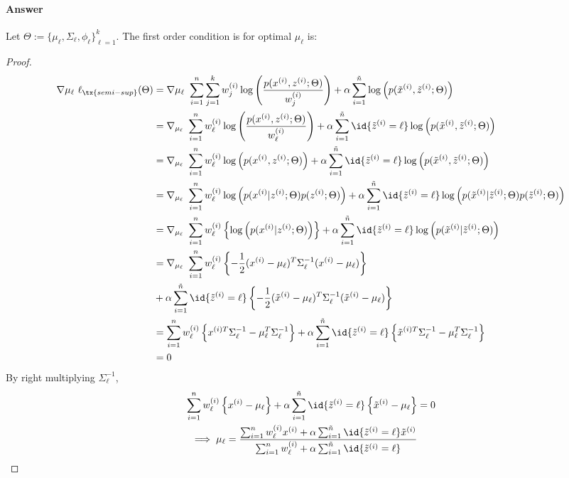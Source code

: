 \documentclass[11pt]{article}
\newcommand{\upi}[0]{^{(i)}}
\begin{document}
	\paragraph{Answer} Let $\Theta := \{\mu_\ell, \Sigma_\ell, \phi_\ell\}_{\ell=1}^k$. The first order condition is for optimal $\mu_\ell$ is:
	\begin{proof}
		\begin{align}
			\nabla{\mu_\ell}\ \ell_{\tx{semi-sup}}(\Theta) &= \nabla{\mu_\ell}\ \sum_{i=1}^n \sum_{j=1}^k w\upi_j \log \left( \frac{p(x\upi, z\upi; \Theta)}{w\upi_j} \right) + \alpha \sum_{i=1}^{\tilde{n}} \log \left(p(\tilde{x}\upi, \tilde{z}\upi; \Theta)
			\right) \\
			&= \nabla_{\mu_\ell}\ \sum_{i=1}^n w\upi_\ell \log \left( \frac{p(x\upi, z\upi; \Theta)}{w\upi_\ell} \right) + \alpha \sum_{i=1}^{\tilde{n}} \id{\tilde{z}\upi = \ell} \log \left(p(\tilde{x}\upi, \tilde{z}\upi; \Theta) \right) \\
			&= \nabla_{\mu_\ell}\ \sum_{i=1}^n w\upi_\ell \log \left(p(x\upi, z\upi; \Theta) \right) + \alpha \sum_{i=1}^{\tilde{n}} \id{\tilde{z}\upi = \ell} \log \left(p(\tilde{x}\upi, \tilde{z}\upi; \Theta) \right) \\
			&= \nabla_{\mu_\ell}\ \sum_{i=1}^n w\upi_\ell \log \left(p(x\upi | z\upi; \Theta) p(z\upi; \Theta) \right) + \alpha \sum_{i=1}^{\tilde{n}} \id{\tilde{z}\upi = \ell} \log \left(p(\tilde{x}\upi | \tilde{z}\upi; \Theta) p(\tilde{z}\upi; \Theta) \right) \\
			&= \nabla_{\mu_\ell}\ \sum_{i=1}^n w\upi_\ell \left \{
			\log \left(
			p(x\upi|z\upi; \Theta)
			\right )
			\right\} + \alpha \sum_{i=1}^{\tilde{n}} \id{\tilde{z}\upi = \ell} \log \left(p(\tilde{x}\upi | \tilde{z}\upi; \Theta) \right) \\
			&= \nabla_{\mu_\ell}\ \sum_{i=1}^n w\upi_\ell \left \{- \frac{1}{2} (x\upi - \mu_\ell)^T \Sigma^{-1}_\ell (x\upi - \mu_\ell) \right \} \\
			&+ \alpha \sum_{i=1}^{\tilde{n}} \id{\tilde{z}\upi = \ell} \left \{
			-\frac{1}{2} (\tilde{x}\upi - \mu_\ell)^T \Sigma^{-1}_\ell (\tilde{x}\upi - \mu_\ell)
			\right \} \\
			&= \sum_{i=1}^n w\upi_\ell \left \{
			x^{(i)T} \Sigma^{-1}_\ell - \mu_\ell^T \Sigma^{-1}_\ell
			\right\} + \alpha \sum_{i=1}^{\tilde{n}} \id{\tilde{z}\upi = \ell} \left \{
			\tilde{x}^{(i)T} \Sigma^{-1}_\ell - \mu_\ell^T \Sigma^{-1}_\ell
			\right\} \\
			&= 0
		\end{align}
		By right multiplying $\Sigma_\ell^{-1}$,
		\begin{align}
			\sum_{i=1}^n w\upi_\ell \left \{
			x\upi - \mu_\ell
			\right\} + \alpha \sum_{i=1}^{\tilde{n}} \id{\tilde{z}\upi = \ell} \left \{
			\tilde{x}\upi - \mu_\ell
			\right\} &= 0 \\
			\implies \mu_\ell = \frac{\sum_{i=1}^n w_\ell\upi x\upi + \alpha \sum_{i=1}^{\tilde{n}} \id{\tilde{z}\upi = \ell} \tilde{x}\upi}{\sum_{i=1}^n w_\ell\upi + \alpha \sum_{i=1}^{\tilde{n}} \id{\tilde{z}\upi = \ell}}
		\end{align}
	\end{proof}
\end{document}
